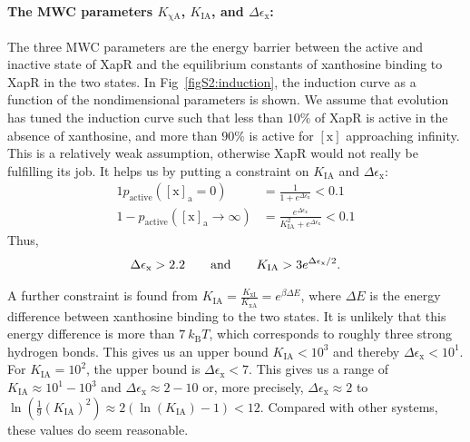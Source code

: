 \documentclass[10pt,letterpaper]{article}
\newcommand{\n}[1]{\mathrm{#1}}
\begin{document}
\paragraph*{The MWC parameters $K_{\n{\chi A}}$, $K_{\n{IA}}$, and $\Delta \epsilon_{\n{x}}$:}
The three MWC parameters are the energy barrier between the active and
inactive state of XapR and the equilibrium constants of xanthosine binding
to XapR in the two states. In Fig~\ref{figS2:induction}, the induction curve
as a function of the nondimensional parameters is shown. We assume that
evolution has tuned the induction curve such that less than $10 \%$ of XapR
is active in the absence of xanthosine, and more than $90 \%$ is active for
$\n{[x]}$ approaching infinity. This is a relatively weak assumption,
otherwise XapR would not really be fulfilling its job. It helps us by
putting a constraint on $K_{\n{IA}}$ and $\Delta \epsilon_{\n{x}}$:
\begin{alignat*}{1}
p_{\n{active}}(\n{[x]_a} = 0) &= \frac{1}{1 + e^{\Delta \epsilon_{\n{x}}}} < 0.1 \\
1-p_{\n{active}}(\n{[x]_a} \to \infty) &= \frac{e^{\Delta \epsilon_{\n{x}}}}{K_{\n{IA}}^2 + e^{\Delta \epsilon_{\n{x}}}} < 0.1
\end{alignat*}
Thus, 
\begin{eqnarray*}
	\Delta \epsilon_{\n{x}} > 2.2 \hspace{2 em} \n{and} \hspace{2 em} K_{\n{IA}} > 3 e^{\Delta \epsilon_{\n{x}} / 2}.
\end{eqnarray*}

A further constraint is found from $K_{\n{IA}}=\frac{K_{\n{x I}}}{K_{\n{x
A}}} = e^{\beta \Delta E}$, where $\Delta E$ is the energy difference
between xanthosine binding to the two states. It is unlikely that this
energy difference is more than $7~k_{\n{B}} T$, which corresponds to roughly
three strong hydrogen bonds. This gives us an upper bound $K_{\n{IA}} <
10^3$ and thereby $\Delta \epsilon_{\n{x}} < 10^1$. For $K_{\n{IA}} = 10^2$,
the upper bound is $\Delta \epsilon_{\n{x}} < 7$. This gives us a range of
$K_{\n{IA}} \approx 10^1 - 10^3$ and $\Delta \epsilon_{\n{x}} \approx 2 -
10$ or, more precisely, $\Delta \epsilon_{\n{x}} \approx 2$ to
$\ln\left(\frac{1}{9} \left(K_{\n{IA}}\right)^2 \right) \approx 2 \left(
\ln\left(K_{\n{IA}}\right) - 1\right) < 12$. Compared with other systems,
these values do seem reasonable. 
\end{document}
